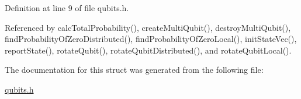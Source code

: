 Definition at line 9 of file qubits.h.

Referenced by calcTotalProbability(), createMultiQubit(), destroyMultiQubit(), findProbabilityOfZeroDistributed(), findProbabilityOfZeroLocal(), initStateVec(), reportState(), rotateQubit(), rotateQubitDistributed(), and rotateQubitLocal().

The documentation for this struct was generated from the following file:\begin{DoxyCompactItemize}
\item 
\hyperlink{qubits_8h}{qubits.h}\end{DoxyCompactItemize}

